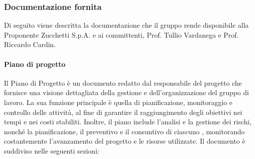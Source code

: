 \subsubsection{Documentazione fornita}
Di seguito viene descritta la documentazione che il gruppo rende disponibile alla Proponente Zucchetti S.p.A. e ai committenti, Prof. Tullio Vardanega e Prof. Riccardo Cardin.

\paragraph{Piano di progetto}
Il Piano di Progetto è un documento redatto dal responsabile del progetto che fornisce una visione dettagliata della gestione e dell’organizzazione del gruppo di lavoro. La sua funzione principale è quella di pianificazione, monitoraggio e controllo delle attività, al fine di garantire il raggiungimento degli obiettivi nei tempi e nei costi stabiliti. Inoltre, il piano include l'analisi e la gestione dei rischi, nonché la pianificazione, il preventivo e il consuntivo di ciascuno , monitorando costantemente l'avanzamento del progetto e le risorse utilizzate.
Il documento è suddiviso nelle seguenti sezioni:
